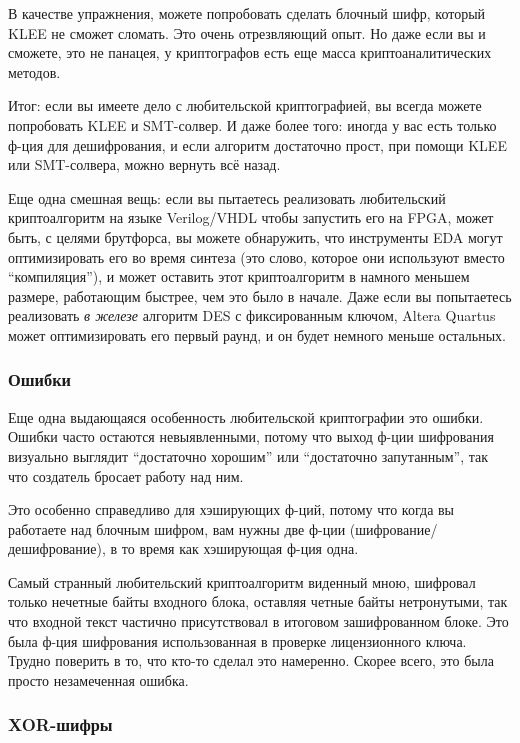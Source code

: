 

В качестве упражнения, можете попробовать сделать блочный шифр, который KLEE не сможет сломать.
Это очень отрезвляющий опыт.
Но даже если вы и сможете, это не панацея, у криптографов есть еще масса криптоаналитических методов.

Итог: если вы имеете дело с любительской криптографией, вы всегда можете попробовать KLEE и SMT-солвер.
И даже более того: иногда у вас есть только ф-ция для дешифрования, и если алгоритм достаточно прост,
при помощи KLEE или SMT-солвера, можно вернуть всё назад.

Еще одна смешная вещь: если вы пытаетесь реализовать любительский криптоалгоритм на языке Verilog/VHDL чтобы запустить
его на \ac{FPGA}, может быть, с целями брутфорса, вы можете обнаружить, что инструменты \ac{EDA} могут оптимизировать
его во время синтеза (это слово, которое они используют вместо ``компиляция''), и может оставить этот криптоалгоритм
в намного меньшем размере, работающим быстрее, чем это было в начале.
Даже если вы попытаетесь реализовать \textit{в железе} алгоритм \ac{DES} с фиксированным ключом,
Altera Quartus может оптимизировать его первый раунд, и он будет немного меньше остальных.

\subsubsection{Ошибки}

Еще одна выдающаяся особенность любительской криптографии это ошибки.
Ошибки часто остаются невыявленными, потому что выход ф-ции шифрования визуально выглядит ``достаточно хорошим''
или ``достаточно запутанным'', так что создатель бросает работу над ним.

Это особенно справедливо для хэширующих ф-ций, потому что когда вы работаете над блочным шифром, вам нужны
две ф-ции (шифрование/дешифрование), в то время как хэширующая ф-ция одна.

Самый странный любительский криптоалгоритм виденный мною, шифровал только нечетные байты входного блока,
оставляя четные байты нетронутыми, так что входной текст частично присутствовал в итоговом зашифрованном блоке.
Это была ф-ция шифрования использованная в проверке лицензионного ключа.
Трудно поверить в то, что кто-то сделал это намеренно.
Скорее всего, это была просто незамеченная ошибка.

\subsubsection{XOR-шифры}

